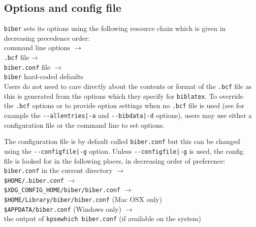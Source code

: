\documentclass{ltxdockit}
\begin{document}
\subsection{Options and config file}
\verb+biber+ sets its options using the following resource 
chain which is given in decreasing precedence order:\\[2ex]

\noindent command line options $\rightarrow$\\
\hspace*{1em}\verb+.bcf+ file$\rightarrow$\\
\hspace*{2em}\verb+biber.conf+ file $\rightarrow$\\
\hspace*{3em}\verb+biber+ hard-coded defaults\\[2ex]

\noindent Users do not need to care directly about the contents or format of the
\verb+.bcf+ file as this is generated from the options which they specify
for \verb+biblatex+. To override the \verb+.bcf+ options or to provide
option settings when no \verb+.bcf+ file is used (see for example the
\verb+--allentries|-a+ and \verb+--bibdata|-d+ options), users
may use either a configuration file or the command line to set options.

The configuration file is by default called \verb+biber.conf+ but this can
be changed using the \verb+--configfile|-g+ option. Unless
\verb+--configfile|-g+ is used, the config file is
looked for in the following places, in decreasing order of preference:\\[2ex]

\noindent \verb+biber.conf+ in the current directory $\rightarrow$\\
\hspace*{1em}\verb+$HOME/.biber.conf+ $\rightarrow$\\
\hspace*{2em}\verb+$XDG_CONFIG_HOME/biber/biber.conf+ $\rightarrow$\\
\hspace*{3em}\verb+$HOME/Library/biber/biber.conf+ (Mac OSX only)\\
\hspace*{3em}\verb+$APPDATA/biber.conf+ (Windows only) $\rightarrow$\\
\hspace*{4em}the output of \verb+kpsewhich biber.conf+ (if available on the
system)\\[2ex]
\end{document}
